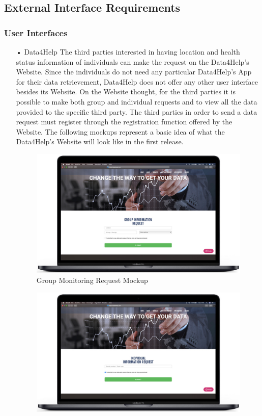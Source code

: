 \subsection{External Interface Requirements}
\subsubsection{User Interfaces}
\begin{enumerate}
\item[•]{\Large Data4Help}
\bigbreak
\noindent
The third parties interested in having location and health status information of individuals can make the request on the Data4Help’s Website. Since the individuals do not need any particular Data4Help’s App for their data retrievement, Data4Help does not offer any other user interface besides its Website. 
On the Website thought, for the third parties it is possible to make both group and individual requests and to view all the data provided to the specific third party. The third parties in order to send a data request must register through the registration function offered by the Website.
\bigbreak
\noindent
The following mockups represent a basic idea of what the Data4Help’s Website will look like in the first release.
\\ [2cm]
\begin{figure}[H]
\centering
\includegraphics[scale=0.3]{Images/Mockups/Grouprequest.jpg}
\caption{Group Monitoring Request Mockup}
\end{figure}
\begin{figure}
\centering
\includegraphics[scale=0.3]{Images/Mockups/IndividualRequest.jpg}

\end{figure}
\end{enumerate}
